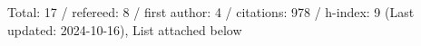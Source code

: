 Total: 17 / refereed: 8 / first author: 4 / citations: 978 / h-index: 9 (Last updated: 2024-10-16), List attached below